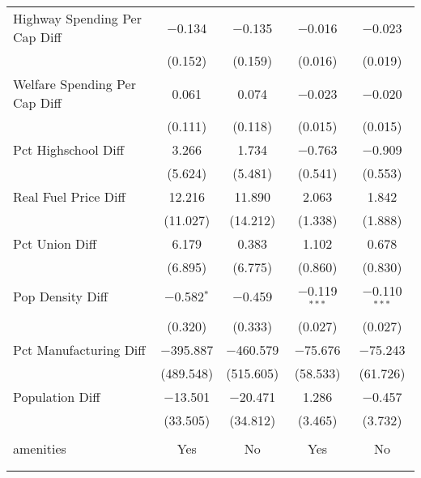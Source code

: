\begin{table}[!htbp]
\begin{tabular}{@{\extracolsep{5pt}}lcccc}
  Highway Spending Per Cap Diff & $-$0.134 & $-$0.135 & $-$0.016 & $-$0.023 \\ 
  & (0.152) & (0.159) & (0.016) & (0.019) \\ 
  Welfare Spending Per Cap Diff & 0.061 & 0.074 & $-$0.023 & $-$0.020 \\ 
  & (0.111) & (0.118) & (0.015) & (0.015) \\ 
  Pct Highschool Diff & 3.266 & 1.734 & $-$0.763 & $-$0.909 \\ 
  & (5.624) & (5.481) & (0.541) & (0.553) \\ 
  Real Fuel Price Diff & 12.216 & 11.890 & 2.063 & 1.842 \\ 
  & (11.027) & (14.212) & (1.338) & (1.888) \\ 
  Pct Union Diff & 6.179 & 0.383 & 1.102 & 0.678 \\ 
  & (6.895) & (6.775) & (0.860) & (0.830) \\ 
  Pop Density Diff & $-$0.582$^{*}$ & $-$0.459 & $-$0.119$^{***}$ & $-$0.110$^{***}$ \\ 
  & (0.320) & (0.333) & (0.027) & (0.027) \\ 
  Pct Manufacturing Diff & $-$395.887 & $-$460.579 & $-$75.676 & $-$75.243 \\ 
  & (489.548) & (515.605) & (58.533) & (61.726) \\ 
  Population Diff & $-$13.501 & $-$20.471 & 1.286 & $-$0.457 \\ 
  & (33.505) & (34.812) & (3.465) & (3.732) \\ 
 \hline \\[-1.8ex] 
amenities & Yes & No & Yes & No \\ 
\hline \\[-1.8ex] 
\hline 
\hline \\[-1.8ex] 
\end{tabular} 
\end{table} 
